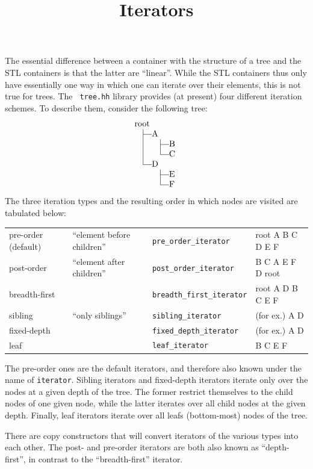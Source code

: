 \documentclass[11pt]{article}
\newcommand{\member}[1]{{\tt #1}\index{#1}}
\def\mystrut{\vbox to 8.5pt{}\vtop to 3.5pt{}}
\def\V{\hskip10pt\vrule\hskip10pt}
\def\T{\hskip10pt\vrule\vrule height2.5pt depth -2.1pt width 10pt}
\def\L{\hskip10pt\vrule height 8.5pt depth -2.1pt
       \vrule height2.5pt depth -2.1pt width 10pt}
\def\N{\hskip10pt\phantom{\vrule}\hskip10pt}
\def\hw{\hskip-1000pt plus 1fil}
\begin{document}
\begin{sectionunit}
\begin{sectionunit}
\end{sectionunit}
\begin{sectionunit}
\title{Iterators}
\maketitle

The essential difference between a container with the structure of a
tree and the STL containers is that the latter are ``linear''. While
the STL containers thus only have essentially one way in which one can
iterate over their elements, this is not true for trees. The {\tt
tree.hh} library provides (at present) four different iteration
schemes. To describe them, consider the following tree:
\begin{equation*}
\vcenter{\offinterlineskip
\halign{&#\mystrut\hfil\cr
 root \hw\cr
 \T A \cr
 \V   \T  B \cr
 \V   \L  C \cr
 \L D \cr
 \N   \T  E \cr
 \N   \L  F \cr}}
\end{equation*}
The three iteration types and the resulting order in which nodes are
visited are tabulated below:
\begin{center}
\begin{tabular}{llll}
pre-order (default) & ``element before children'' &
\member{pre\_order\_iterator}  & root A B C D E F \\
post-order          & ``element after children''  &
\member{post\_order\_iterator} & B C A E F D root \\
breadth-first &  &
\member{breadth\_first\_iterator} & root A D B C E F  \\
sibling             & ``only siblings'' & 
\member{sibling\_iterator} & (for ex.) A D \\
fixed-depth         & &
\member{fixed\_depth\_iterator} & (for ex.) A D \\
leaf                & &
\member{leaf\_iterator} & B C E F
\end{tabular}
\end{center}
The pre-order ones are the default iterators, and therefore also known
under the name of {\tt iterator}. Sibling iterators and fixed-depth
iterators iterate only over the nodes at a given depth of the
tree. The former restrict themselves to the child nodes of one given
node, while the latter iterates over all child nodes at the given
depth. Finally, leaf iterators iterate over all leafs (bottom-most)
nodes of the tree.

There are copy constructors that will convert iterators of the
various types into each other. The post- and pre-order iterators are
both also known as ``depth-first'', in contrast to the
``breadth-first'' iterator.


\end{sectionunit}
\end{sectionunit}
\end{document}
